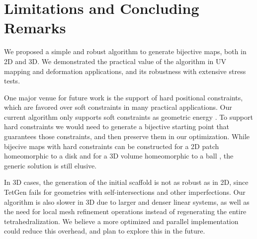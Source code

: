 \section{Limitations and Concluding Remarks}

We proposed a simple and robust algorithm to generate bijective maps, both in 2D and 3D. We demonstrated the practical value of the algorithm in UV mapping and deformation applications, and its robustness with extensive stress tests.

One major venue for future work is the support of hard positional constraints, which are favored over soft constraints in many practical applications. Our current algorithm only supports soft constraints as geometric energy \cite{Schuller:2013}. To support hard constraints we would need to generate a bijective starting point that guarantees those constraints, and then preserve them in our optimization. While bijecive maps with hard constraints can be constructed for a 2D patch homeomorphic to a disk \cite{Weber:2014:LIP} and for a 3D volume homeomorphic to a ball \cite{Campen:2016}, the generic solution is still elusive.

In 3D cases, the generation of the initial scaffold is not as robust as in 2D, since TetGen fails for geometries with self-intersections and other imperfections. Our algorithm is also slower in 3D due to larger and denser linear systems, as well as the need for local mesh refinement operations instead of regenerating the entire tetrahedralization. We believe a more optimized and parallel implementation could reduce this overhead, and plan to explore this in the future.




